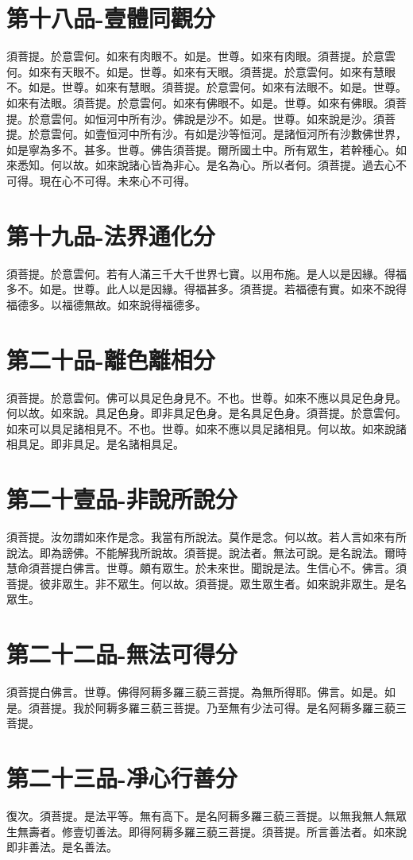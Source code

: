 \documentclass[a6paper, 22pt, twocolumn]{cvertbook}
\begin{document}
\chapter{第十八品-壹體同觀分}
須菩提。於意雲何。如來有肉眼不。如是。世尊。如來有肉眼。須菩提。於意雲何。如來有天眼不。如是。世尊。如來有天眼。須菩提。於意雲何。如來有慧眼不。如是。世尊。如來有慧眼。須菩提。於意雲何。如來有法眼不。如是。世尊。如來有法眼。須菩提。於意雲何。如來有佛眼不。如是。世尊。如來有佛眼。須菩提。於意雲何。如恒河中所有沙。佛說是沙不。如是。世尊。如來說是沙。須菩提。於意雲何。如壹恒河中所有沙。有如是沙等恒河。是諸恒河所有沙數佛世界，如是寧為多不。甚多。世尊。佛告須菩提。爾所國土中。所有眾生，若幹種心。如來悉知。何以故。如來說諸心皆為非心。是名為心。所以者何。須菩提。過去心不可得。現在心不可得。未來心不可得。
\chapter{第十九品-法界通化分}
須菩提。於意雲何。若有人滿三千大千世界七寶。以用布施。是人以是因緣。得福多不。如是。世尊。此人以是因緣。得福甚多。須菩提。若福德有實。如來不說得福德多。以福德無故。如來說得福德多。
\chapter{第二十品-離色離相分}
須菩提。於意雲何。佛可以具足色身見不。不也。世尊。如來不應以具足色身見。何以故。如來說。具足色身。即非具足色身。是名具足色身。須菩提。於意雲何。如來可以具足諸相見不。不也。世尊。如來不應以具足諸相見。何以故。如來說諸相具足。即非具足。是名諸相具足。
\chapter{第二十壹品-非說所說分}
須菩提。汝勿謂如來作是念。我當有所說法。莫作是念。何以故。若人言如來有所說法。即為謗佛。不能解我所說故。須菩提。說法者。無法可說。是名說法。爾時慧命須菩提白佛言。世尊。頗有眾生。於未來世。聞說是法。生信心不。佛言。須菩提。彼非眾生。非不眾生。何以故。須菩提。眾生眾生者。如來說非眾生。是名眾生。
\chapter{第二十二品-無法可得分}
須菩提白佛言。世尊。佛得阿耨多羅三藐三菩提。為無所得耶。佛言。如是。如是。須菩提。我於阿耨多羅三藐三菩提。乃至無有少法可得。是名阿耨多羅三藐三菩提。

\chapter{第二十三品-凈心行善分}
復次。須菩提。是法平等。無有高下。是名阿耨多羅三藐三菩提。以無我無人無眾生無壽者。修壹切善法。即得阿耨多羅三藐三菩提。須菩提。所言善法者。如來說即非善法。是名善法。
\end{document}
